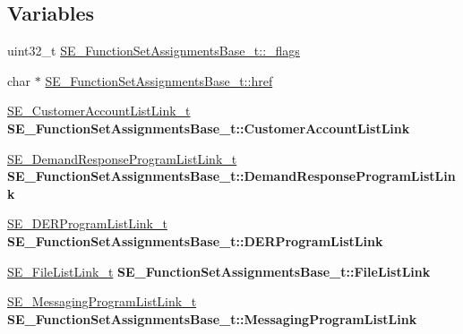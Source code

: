 \subsection*{Variables}
\begin{DoxyCompactItemize}
\item 
uint32\+\_\+t \hyperlink{group__FunctionSetAssignmentsBase_ga5d0d51e00ef4d0d4b10f4bdf5b342ef5}{S\+E\+\_\+\+Function\+Set\+Assignments\+Base\+\_\+t\+::\+\_\+flags}
\item 
char $\ast$ \hyperlink{group__FunctionSetAssignmentsBase_ga1e4079acb45b90e4b02778ab5c0e7147}{S\+E\+\_\+\+Function\+Set\+Assignments\+Base\+\_\+t\+::href}
\item 
\mbox{\label{group__FunctionSetAssignmentsBase_ga20f977fa28caa4d69bbb4e6bceae374b}} 
\hyperlink{structSE__CustomerAccountListLink__t}{S\+E\+\_\+\+Customer\+Account\+List\+Link\+\_\+t} {\bfseries S\+E\+\_\+\+Function\+Set\+Assignments\+Base\+\_\+t\+::\+Customer\+Account\+List\+Link}
\item 
\mbox{\label{group__FunctionSetAssignmentsBase_gae14119d2d07b5f010fa815d9919e43b0}} 
\hyperlink{structSE__DemandResponseProgramListLink__t}{S\+E\+\_\+\+Demand\+Response\+Program\+List\+Link\+\_\+t} {\bfseries S\+E\+\_\+\+Function\+Set\+Assignments\+Base\+\_\+t\+::\+Demand\+Response\+Program\+List\+Link}
\item 
\mbox{\label{group__FunctionSetAssignmentsBase_ga44329f0bcbd091983a601fbe2f1236f4}} 
\hyperlink{structSE__DERProgramListLink__t}{S\+E\+\_\+\+D\+E\+R\+Program\+List\+Link\+\_\+t} {\bfseries S\+E\+\_\+\+Function\+Set\+Assignments\+Base\+\_\+t\+::\+D\+E\+R\+Program\+List\+Link}
\item 
\mbox{\label{group__FunctionSetAssignmentsBase_gaeb879f01dba3ec740a236c7b5bbc1ff0}} 
\hyperlink{structSE__FileListLink__t}{S\+E\+\_\+\+File\+List\+Link\+\_\+t} {\bfseries S\+E\+\_\+\+Function\+Set\+Assignments\+Base\+\_\+t\+::\+File\+List\+Link}
\item 
\mbox{\label{group__FunctionSetAssignmentsBase_ga14fd26a249b03658ae587b816bd0401a}} 
\hyperlink{structSE__MessagingProgramListLink__t}{S\+E\+\_\+\+Messaging\+Program\+List\+Link\+\_\+t} {\bfseries S\+E\+\_\+\+Function\+Set\+Assignments\+Base\+\_\+t\+::\+Messaging\+Program\+List\+Link}

\end{DoxyCompactItemize}
